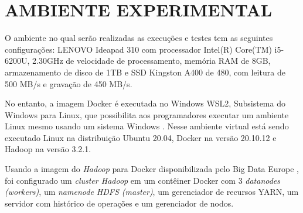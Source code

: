 \section{AMBIENTE EXPERIMENTAL} \label{sec:ambienteexperimental}

O ambiente no qual serão realizadas as execuções e testes tem as seguintes configurações: LENOVO Ideapad 310 com processador Intel(R) Core(TM) i5-6200U, 2.30GHz de velocidade de processamento,  memória RAM de 8GB, armazenamento de disco de 1TB e SSD Kingston A400 de 480, com leitura de 500 MB/s e gravação de 450 MB/s. 

No entanto, a imagem Docker é executada no Windows WSL2, Subsistema do Windows para Linux, que possibilita aos programadores executar um ambiente Linux mesmo usando um sistema Windows \cite{MicrosoftWSL22}. Nesse ambiente virtual está sendo executado Linux na distribuição Ubuntu 20.04, Docker na versão 20.10.12 e Hadoop na versão 3.2.1.

Usando a imagem do \textit{Hadoop} para Docker disponibilizada pelo Big Data Europe \cite{BigDataHadoopGithub}, foi configurado um \textit{cluster Hadoop} em um contêiner Docker com 3 \textit{datanodes (workers)}, um \textit{namenode HDFS (master)}, um gerenciador de recursos YARN, um servidor com histórico de operações e um gerenciador de nodos.
